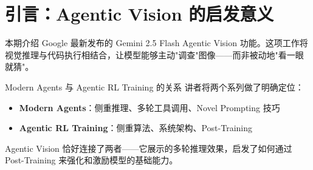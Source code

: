\section{引言：Agentic Vision 的启发意义}

本期介绍 Google 最新发布的 Gemini 2.5 Flash Agentic Vision 功能。这项工作将视觉推理与代码执行相结合，让模型能够主动"调查"图像——而非被动地"看一眼就猜"。

\begin{knowledgebox}{Modern Agents 与 Agentic RL Training 的关系}
讲者将两个系列做了明确定位：
\begin{itemize}
    \item \textbf{Modern Agents}：侧重推理、多轮工具调用、Novel Prompting 技巧
    \item \textbf{Agentic RL Training}：侧重算法、系统架构、Post-Training
\end{itemize}
Agentic Vision 恰好连接了两者——它展示的多轮推理效果，启发了如何通过 Post-Training 来强化和激励模型的基础能力。
\end{knowledgebox}


